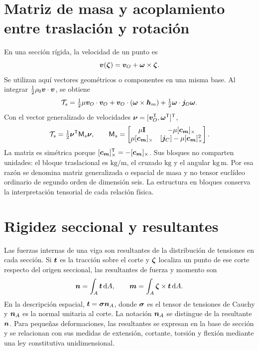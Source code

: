 \section{Matriz de masa y acoplamiento entre traslación y rotación}
En una sección rígida, la velocidad de un punto es
\begin{equation}
 \bm{v}(\bm{\zeta})=\bm{v}_O+\bm{\omega}\times\bm{\zeta}.
\end{equation}
Se utilizan aquí vectores geométricos o componentes en una misma base. Al integrar $\frac12\rho_0\bm{v}\cdot\bm{v}$, se obtiene
\begin{equation}
 \mathcal T_s=\tfrac12\mu\bm{v}_O\cdot\bm{v}_O
 +\bm{v}_O\cdot(\bm{\omega}\times\bm{h}_m)
 +\tfrac12\bm{\omega}\cdot\boldsymbol{j}_O\bm{\omega}.
\end{equation}
Con el vector generalizado de velocidades $\bm{\nu}=[\bm{v}_O^\mathsf T,\bm{\omega}^\mathsf T]^\mathsf T$,
\begin{equation}
 \mathcal T_s=\tfrac12\bm{\nu}^\mathsf T\mathsf M_s\bm{\nu},\qquad
 \mathsf M_s=
 \begin{bmatrix}
 \mu\mathbf I&-\mu[\bm{c_m}]_{\times}\\
 \mu[\bm{c_m}]_{\times}&[\boldsymbol{j}_C]-\mu[\bm{c_m}]_{\times}^{2}
 \end{bmatrix}.
 \label{eq:mass6}
\end{equation}
La matriz es simétrica porque $[\bm{c_m}]_{\times}^\mathsf T=-[\bm{c_m}]_{\times}$. Sus bloques no comparten unidades: el bloque traslacional es $\mathrm{kg/m}$, el cruzado $\mathrm{kg}$ y el angular $\mathrm{kg\,m}$. Por esa razón se denomina matriz generalizada o espacial de masa y no tensor euclídeo ordinario de segundo orden de dimensión seis. La estructura en bloques conserva la interpretación tensorial de cada relación física.

\section{Rigidez seccional y resultantes}
Las fuerzas internas de una viga son resultantes de la distribución de tensiones en cada sección. Si $\bm{t}$ es la tracción sobre el corte y $\bm{\zeta}$ localiza un punto de ese corte respecto del origen seccional, las resultantes de fuerza y momento son
\begin{equation}
 \bm{n}=\int_A\bm{t}\,\mathrm d A,\qquad
 \bm{m}=\int_A\bm{\zeta}\times\bm{t}\,\mathrm d A.
 \label{eq:resultantes-seccion}
\end{equation}
En la descripción espacial, $\bm{t}=\boldsymbol{\sigma}\bm{n}_A$, donde $\boldsymbol{\sigma}$ es el tensor de tensiones de Cauchy y $\bm{n}_A$ es la normal unitaria al corte. La notación $\bm{n}_A$ se distingue de la resultante $\bm{n}$. Para pequeñas deformaciones, las resultantes se expresan en la base de sección y se relacionan con sus medidas de extensión, cortante, torsión y flexión mediante una ley constitutiva unidimensional.

